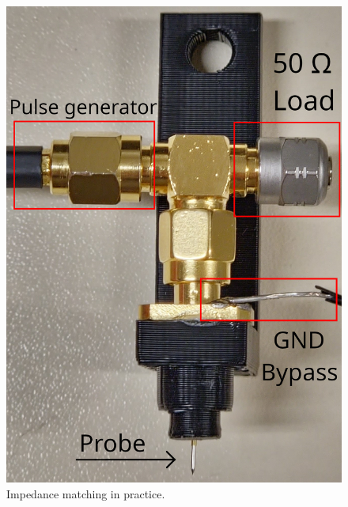 
\begin{figure}[h]
	\centering
	\includegraphics[width=0.40\columnwidth]{./figures/sondeGndSource.jpg}
	\caption{Impedance matching in practice.}
	\label{imp_match_real}
\end{figure}
